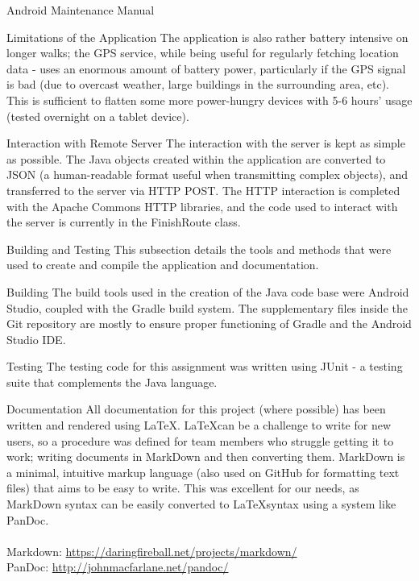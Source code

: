 \documentclass{article}
\begin{document}
\begin{section}{Android Maintenance Manual}
\begin{subsection}{Limitations of the Application}
		The application is also rather battery intensive on longer walks; the GPS service, while being useful for regularly fetching location data - uses an enormous amount of battery power, particularly if the GPS signal is bad (due to overcast weather, large buildings in the surrounding area, etc). This is sufficient to flatten some more power-hungry devices with 5-6 hours' usage (tested overnight on a tablet device).
	\end{subsection}
	
	\begin{subsection}{Interaction with Remote Server}
		The interaction with the server is kept as simple as possible. The Java objects created within the application are converted to JSON (a human-readable format useful when transmitting complex objects), and transferred to the server via HTTP POST. The HTTP interaction is completed with the Apache Commons HTTP libraries, and the code used to interact with the server is currently in the FinishRoute class.
	\end{subsection}
	
	\newpage
	\begin{subsection}{Building and Testing}
		This subsection details the tools and methods that were used to create and compile the application and documentation.
		
		\begin{subsubsection}{Building}
			The build tools used in the creation of the Java code base were Android Studio, coupled with the Gradle build system. The supplementary files inside the Git repository are mostly to ensure proper functioning of Gradle and the Android Studio IDE.
		\end{subsubsection}
		
		\begin{subsubsection}{Testing}
			The testing code for this assignment was written using JUnit - a testing suite that complements the Java language.
		\end{subsubsection}
		
		\begin{subsubsection}{Documentation}
			All documentation for this project (where possible) has been written and rendered using \LaTeX. \LaTeX can be a challenge to write for new users, so a procedure was defined for team members who struggle getting it to work; writing documents in MarkDown and then converting them. MarkDown is a minimal, intuitive markup language (also used on GitHub for formatting text files) that aims to be easy to write. This was excellent for our needs, as MarkDown syntax can be easily converted to \LaTeX syntax using a system like PanDoc. \\ \\
			Markdown: \url{https://daringfireball.net/projects/markdown/} \\
			PanDoc: \url{http://johnmacfarlane.net/pandoc/}
		\end{subsubsection}
		

\end{subsection}
\end{section}
\end{document}
